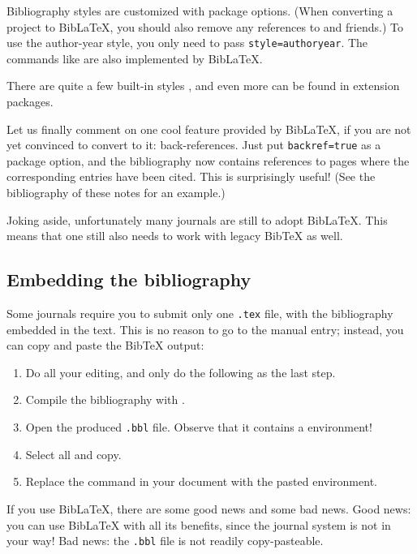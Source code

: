 Bibliography styles are customized with package options.
(When converting a project to BibLaTeX,
you should also remove any references to  and friends.)
To use the author-year style, you only need to pass \verb|style=authoryear|.
The  commands like 
are also implemented by BibLaTeX.

There are quite a few built-in styles \cite[Section~3.3]{biblatex},
and even more can be found in extension packages.

Let us finally comment on one cool feature provided by BibLaTeX,
if you are not yet convinced to convert to it: back-references.
Just put \verb|backref=true| as a package option,
and the bibliography now contains references to pages where the corresponding entries have been cited.
This is surprisingly useful!
(See the bibliography of these notes for an example.)

\begin{practices}
Joking aside, unfortunately many journals are still to adopt BibLaTeX.
This means that one still also needs to work with legacy BibTeX as well.
\end{practices}


%
\subsection{Embedding the bibliography}

Some journals require you to submit only one \verb|.tex| file,
with the bibliography embedded in the text.
This is no reason to go to the manual entry;
instead, you can copy and paste the BibTeX output:

\begin{enumerate}
\addtocounter{enumi}{-1}
\item Do all your editing, and only do the following as the last step.
\item Compile the bibliography with .
\item Open the produced \verb|.bbl| file.
    Observe that it contains a  environment!
\item Select all and copy.
\item Replace the \verb|| command in your document
    with the pasted environment.
\end{enumerate}

If you use BibLaTeX, there are some good news and some bad news.
Good news: you can use BibLaTeX with all its benefits,
since the journal system is not in your way!
Bad news: the \verb|.bbl| file is not readily copy-pasteable.

